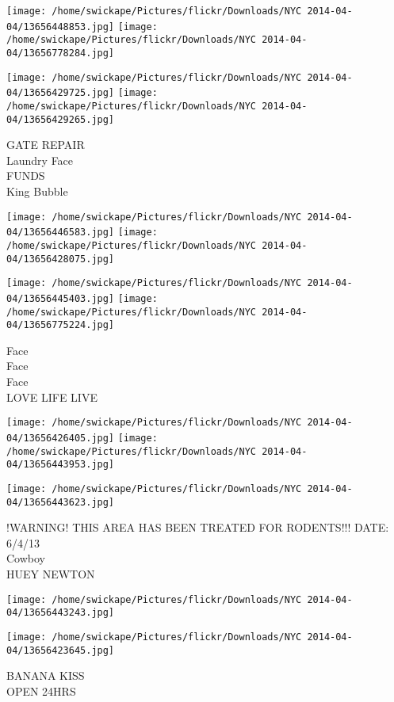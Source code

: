 \documentclass[10pt,letterpaper]{article}
\begin{document}
\texttt{[image: /home/swickape/Pictures/flickr/Downloads/NYC 2014-04-04/13656448853.jpg]}
\texttt{[image: /home/swickape/Pictures/flickr/Downloads/NYC 2014-04-04/13656778284.jpg]}

\texttt{[image: /home/swickape/Pictures/flickr/Downloads/NYC 2014-04-04/13656429725.jpg]}
\texttt{[image: /home/swickape/Pictures/flickr/Downloads/NYC 2014-04-04/13656429265.jpg]}

GATE REPAIR\\
Laundry Face\\
FUNDS\\
King Bubble\\
\pagebreak

\texttt{[image: /home/swickape/Pictures/flickr/Downloads/NYC 2014-04-04/13656446583.jpg]}
\texttt{[image: /home/swickape/Pictures/flickr/Downloads/NYC 2014-04-04/13656428075.jpg]}

\texttt{[image: /home/swickape/Pictures/flickr/Downloads/NYC 2014-04-04/13656445403.jpg]}
\texttt{[image: /home/swickape/Pictures/flickr/Downloads/NYC 2014-04-04/13656775224.jpg]}

Face\\
Face\\
Face\\
LOVE LIFE LIVE\\
\pagebreak

\texttt{[image: /home/swickape/Pictures/flickr/Downloads/NYC 2014-04-04/13656426405.jpg]}
\texttt{[image: /home/swickape/Pictures/flickr/Downloads/NYC 2014-04-04/13656443953.jpg]}

\vspace{0.25in}
\texttt{[image: /home/swickape/Pictures/flickr/Downloads/NYC 2014-04-04/13656443623.jpg]}

!WARNING! THIS AREA HAS BEEN TREATED FOR RODENTS!!! DATE: 6/4/13\\
Cowboy\\
HUEY NEWTON\\
\pagebreak

\texttt{[image: /home/swickape/Pictures/flickr/Downloads/NYC 2014-04-04/13656443243.jpg]}

\vspace{0.25in}
\texttt{[image: /home/swickape/Pictures/flickr/Downloads/NYC 2014-04-04/13656423645.jpg]}

BANANA KISS\\
OPEN 24HRS\\
\pagebreak
\end{document}

